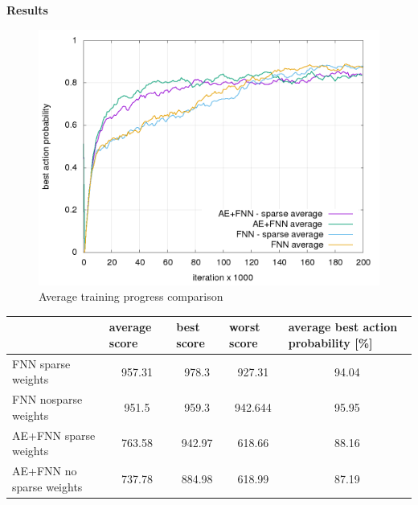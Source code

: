 \documentclass[xcolor=dvipsnames]{beamer}
\begin{document}
\begin{frame}{\bf Results}


\begin{figure}[!h]
  \centering
  \includegraphics[scale=0.25]{../../results/rl_arcade/training_progress.png}
  \caption*{Average training progress comparison}
  \label{img:Average training progress comparison}
\end{figure}

{
\tiny
\begin{table}[]
\centering
\label{tab:summary_results}
\begin{tabular}{|l|c|c|c|c|}
\hline
                         & \multicolumn{1}{l|}{average score} & \multicolumn{1}{l|}{best score} & \multicolumn{1}{l|}{worst score} & \multicolumn{1}{l|}{average best action probability {[}\%{]}} \\ \hline
FNN sparse weights       & 957.31                             & 978.3                          & 927.31                           & 94.04                                                       \\ \hline
FNN nosparse weights     & 951.5                             & 959.3                          & 942.644                           & 95.95                                                   \\ \hline
AE+FNN sparse weights    & 763.58                             & 942.97                          & 618.66                           & 88.16                                                       \\ \hline
AE+FNN no sparse weights & 737.78                             & 884.98                          & 618.99                           & 87.19                                                        \\ \hline
\end{tabular}
\end{table}
}

\end{frame}
\end{document}
